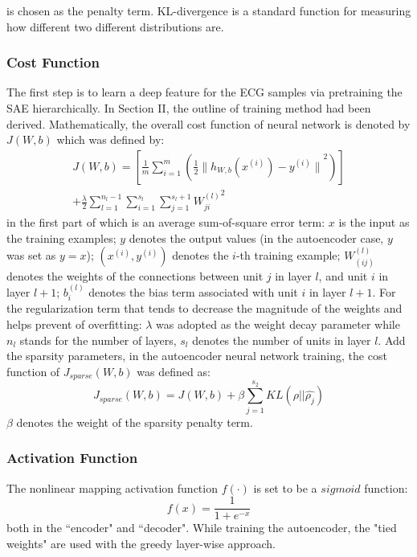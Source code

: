 \documentclass[journal]{IEEEtran}
\begin{document}
\noindent is chosen as the  penalty term. KL-divergence is a standard function for measuring how different two different distributions are. 
\subsubsection{Cost Function}
The first step is to learn a deep feature for the ECG samples via pretraining the SAE hierarchically. In Section II, the outline of training method had been derived. Mathematically, the overall cost function of neural network is denoted by $J(W, b)$ which was defined by:
\begin{equation}
\begin{split}
J(W,b) = [\frac{1}{m}\sum_{i=1}^m(\frac{1}{2}{\|{h_{W,b}(x^{(i)})} - y^{(i)}\|}^2)] \\
+ \frac{\lambda}{2}\sum_{l=1}^{n_l-1} \sum_{i=1}^{s_l} \sum_{j=1}^{s_l+1}{W_{ji}^{(l)}}^2
\end{split}
\end{equation}
in the first part of which is an average sum-of-square error term: $x$ is the input as the training examples; $y$ denotes the output values (in the autoencoder case, $y$ was set as $y=x$); $(x^{(i)}, y^{(i)})$ denotes the $i$-th training example; $W^{(l)}_{(ij)}$ denotes the weights of the connections between unit $j$ in layer $l$, and unit $i$ in layer $l+1$; $b_i^{(l)}$ denotes the bias term associated with unit $i$ in layer $l+1$. For the regularization term that tends to decrease the magnitude of the weights and helps prevent of overfitting: $\lambda$ was adopted as the weight decay parameter while $n_l$ stands for the number of layers, $s_l$ denotes the number of units in layer $l$.
Add the sparsity parameters, in the autoencoder neural network training, the cost function of $J_{sparse}(W,b)$ was defined as:
\begin{equation}
J_{sparse}(W,b) = J(W,b) + \beta \sum_{j=1}^{s_2}KL(\rho||\hat{\rho_j})
\end{equation}
\noindent $\beta$ denotes the weight of the sparsity penalty term. 


\subsubsection{Activation Function}
The nonlinear mapping activation function $f(\cdot)$ is set to be a $sigmoid$ function:
\begin{equation}
f(x) = \frac{1}{1+e^{-x}}
\end{equation}
both in the ``encoder" and ``decoder". While training the autoencoder, the "tied weights" are used with the greedy layer-wise approach. 
\end{document}
